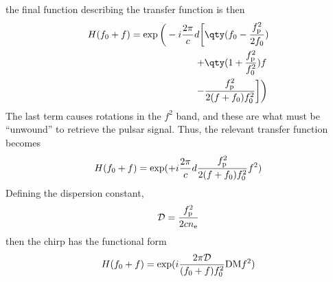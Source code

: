 the final function describing the transfer function is then
\begin{align}
  \label{eq:121}
  H(f_0+f) = \exp \bigg( - i \frac{2 \pi}{c} d \bigg[ & \qty( f_0 - \frac{f_{\rm p}^2}{2 f_0}) \nonumber\\
+ & \qty(1 + \frac{f_{\rm p}^2}{f_0^2})f \nonumber\\
 -& \frac{f_{\rm p}^2}{2(f+f_0)f_0^2} \bigg] \bigg) 
\end{align}
The last term causes rotations in the $f^2$ band, and these are what
must be ``unwound'' to retrieve the pulsar signal. Thus, the relevant
transfer function becomes 
\begin{equation}
  \label{eq:122}
  H(f_0 +f) = \exp( + i \frac{2 \pi}{c} d \frac{f_{\rm p}^2}{2(f+f_0)f_0^2}f^2)
\end{equation}
Defining the dispersion constant, 
\[ \mathcal{D} = \frac{f_{\rm p}^2}{2 c n_{\rm e}} \] 
then the chirp has the functional form
\begin{equation}
  \label{eq:16}
  H(f_0 + f) =\exp( i \frac{2 \pi \mathcal{D}}{(f_0+f)f_0^2} {\rm DM} f^2 )
\end{equation}


